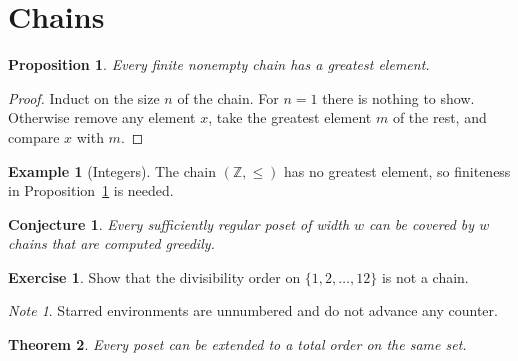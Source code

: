 \documentclass{article}
\theoremstyle{plain}
\newtheorem{theorem}{Theorem}[section]
\newtheorem{proposition}[theorem]{Proposition}
\newtheorem*{conjecture}{Conjecture}
\theoremstyle{definition}
\newtheorem{example}{Example}
\newtheorem*{exercise}{Exercise}
\theoremstyle{remark}
\newtheorem*{note}{Note}
\begin{document}
\section{Chains}

\begin{proposition}\label{prop:chain}
Every finite nonempty chain has a greatest element.
\end{proposition}

\begin{proof}
Induct on the size $n$ of the chain. For $n = 1$ there is nothing to show.
Otherwise remove any element $x$, take the greatest element $m$ of the rest,
and compare $x$ with $m$.
\end{proof}

\begin{example}[Integers]
The chain $(\mathbb{Z},\le)$ has no greatest element, so finiteness in
Proposition~\ref{prop:chain} is needed.
\end{example}

\begin{conjecture}
Every sufficiently regular poset of width $w$ can be covered by $w$ chains
that are computed greedily.
\end{conjecture}

\begin{exercise}
Show that the divisibility order on $\{1,2,\dots,12\}$ is not a chain.
\end{exercise}

\begin{note}
Starred environments are unnumbered and do not advance any counter.
\end{note}

\begin{theorem}
Every poset can be extended to a total order on the same set.
\end{theorem}
\end{document}
